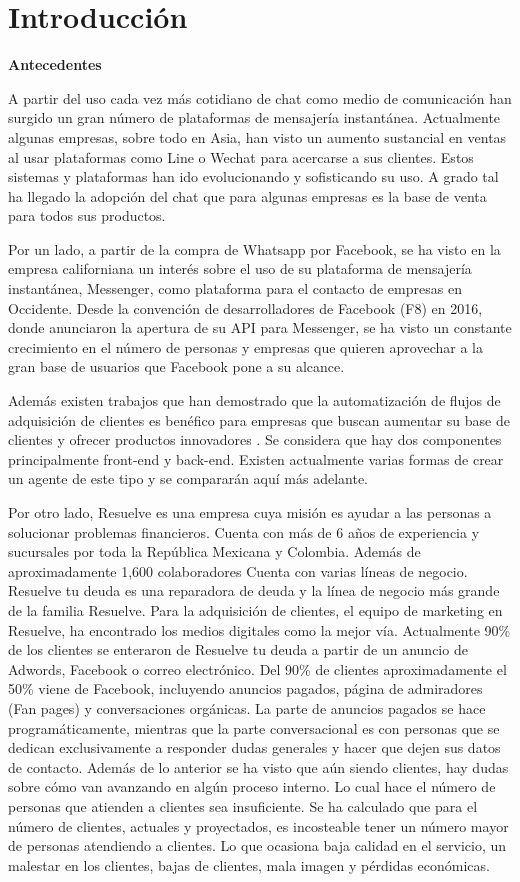 \chapter{Introducción}

\textbf{Antecedentes}

A partir del uso cada vez más cotidiano de chat como medio de comunicación han surgido un gran número de plataformas de mensajería instantánea. Actualmente algunas empresas, sobre todo en Asia, han visto un aumento sustancial en ventas al usar plataformas como Line o Wechat para acercarse a sus clientes. Estos sistemas y plataformas han ido evolucionando y sofisticando su uso. A grado tal ha llegado la adopción del chat que para algunas empresas es la base de venta para todos sus productos.

Por un lado, a partir de la compra de Whatsapp por Facebook, se ha visto en la empresa californiana un interés sobre el uso de su plataforma de mensajería instantánea, Messenger, como plataforma para el contacto de empresas en Occidente. 
Desde la convención de desarrolladores de Facebook (F8) en 2016, donde anunciaron la apertura de su API para Messenger, se ha visto un constante crecimiento en el número de personas y empresas que quieren aprovechar a la gran base de usuarios que Facebook pone a su alcance.

Además existen trabajos que han demostrado que la automatización de flujos de adquisición de clientes es benéfico para empresas que buscan aumentar su base de clientes y ofrecer productos innovadores \cite{makar2014automatic}. Se considera que hay dos componentes principalmente front-end y back-end.\cite{patil2017comparative} Existen actualmente varias formas de crear un agente de este tipo y se compararán aquí más adelante. 

Por otro lado, Resuelve es una empresa cuya misión es ayudar a las personas a solucionar problemas financieros. Cuenta con más de 6 años de experiencia y sucursales por toda la República Mexicana y Colombia. Además de aproximadamente 1,600 colaboradores  Cuenta con varias líneas de negocio. Resuelve tu deuda es una reparadora de deuda y la línea de negocio más grande de la familia Resuelve. Para la  adquisición de clientes, el equipo de marketing en Resuelve, ha encontrado los medios digitales como la mejor vía. Actualmente  90\% de los clientes se enteraron de Resuelve tu deuda a partir de un anuncio de Adwords, Facebook o correo electrónico. Del 90\% de clientes aproximadamente el 50\% viene de Facebook, incluyendo anuncios pagados, página de admiradores (Fan pages) y conversaciones orgánicas. La parte de anuncios pagados se hace programáticamente, mientras que la parte conversacional es con personas que se dedican exclusivamente a responder dudas generales y hacer que dejen sus datos de contacto. 
Además de lo anterior se ha visto que aún siendo clientes, hay dudas sobre cómo van avanzando en algún proceso interno. Lo cual hace el número de personas que atienden a clientes sea insuficiente. Se ha calculado que para el número de clientes, actuales y proyectados, es incosteable tener un número mayor de personas atendiendo a clientes.  Lo que ocasiona baja calidad en el servicio, un malestar en los clientes, bajas de clientes, mala imagen y pérdidas económicas. 


